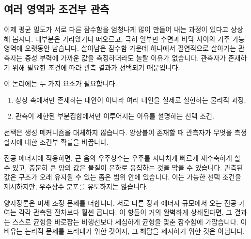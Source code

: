 \subsection{여러 영역과 조건부 관측}

이제 평균 밀도가 서로 다른 잠수함을 엄청나게 많이 만들어 내는 과정이 있다고 상상해 봅시다. 대부분은 가라앉거나 떠오르고, 극히 일부만 수면과 바닥 사이의 거주 가능 영역에 오랫동안 남습니다. 살아남은 잠수함 가운데 하나에서 필연적으로 살아가는 관측자는 중성 부력에 가까운 값을 측정하더라도 놀랄 이유가 없습니다. 관측자가 존재하기 위해 필요한 조건에 따라 관측 결과가 선택되기 때문입니다.

이 논리에는 두 가지 요소가 필요합니다.
\begin{enumerate}
\item 상상 속에서만 존재하는 대안이 아니라 여러 대안을 실제로 실현하는 물리적 과정;
\item 관측이 제한된 부분집합에서만 이루어지는 이유를 설명하는 선택 조건.
\end{enumerate}
선택은 생성 메커니즘을 대체하지 않습니다. 앙상블이 존재할 때 관측자가 무엇을 측정할지에 대한 조건부 확률을 바꿉니다.

\begin{classroomqa}
\end{classroomqa}

진공 에너지에 적용하면, 큰 음의 우주상수는 우주를 지나치게 빠르게 재수축하게 할 수 있고, 충분히 큰 양의 값은 물질이 은하로 응집하는 것을 막을 수 있습니다. 관측된 값은 구조가 오래 유지될 수 있는 좁은 범위 안에 있습니다. 이는 가능한 선택 조건을 제시하지만, 우주상수 분포를 유도하지는 않습니다.

양자장론은 미세 조정 문제를 더합니다. 서로 다른 장과 에너지 규모에서 오는 진공 기여는 각각 관측된 잔차보다 훨씬 큽니다. 이 항들이 거의 완벽하게 상쇄된다면, 그 결과는 스스로 균형을 바로잡는 비행선보다 세심하게 균형을 맞춘 잠수함에 가깝습니다. 이 비유는 논리적 문제를 드러내기 위한 것이지, 그 해답을 제시하기 위한 것은 아닙니다.

\begin{classroomqa}
\end{classroomqa}

